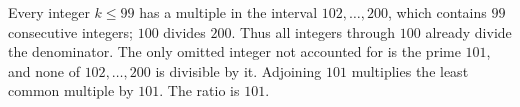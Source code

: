 Every integer $k\le99$ has a multiple in the interval $102,\ldots,200$, which contains $99$ consecutive integers; $100$ divides $200$. Thus all integers through $100$ already divide the denominator. The only omitted integer not accounted for is the prime $101$, and none of $102,\ldots,200$ is divisible by it. Adjoining $101$ multiplies the least common multiple by $101$. The ratio is $\boxed{101}$.
